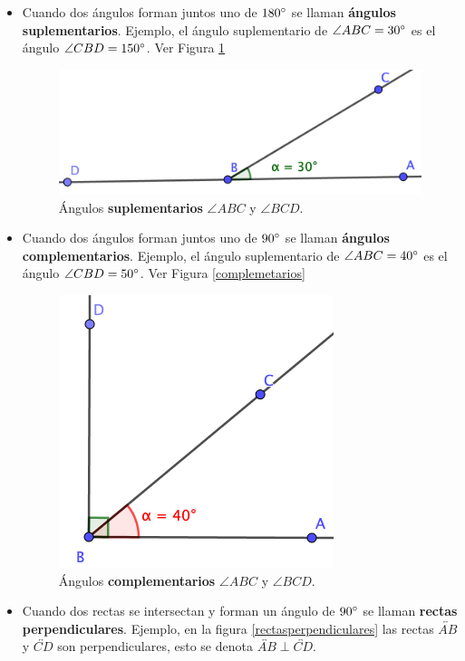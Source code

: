 \begin{itemize}
	\item Cuando dos ángulos forman juntos uno de $180\degree$ se llaman \textbf{ángulos suplementarios}. Ejemplo, el ángulo suplementario de $\angle ABC= 30\degree$ es el ángulo $\angle CBD = 150\degree $. Ver Figura \ref{suplementarios}
	
	\begin{figure}[H]
		\centering
		\includegraphics[width=0.7\linewidth]{Geometria/imgs/suplementarios}
		\caption{Ángulos \textbf{suplementarios} $\angle ABC$ y $\angle BCD$.}
		\label{suplementarios}
	\end{figure}
	
	\item Cuando dos ángulos forman juntos uno de $90\degree$ se llaman \textbf{ángulos complementarios}. Ejemplo, el ángulo suplementario de $\angle ABC= 40\degree$ es el ángulo $\angle CBD = 50\degree $. Ver Figura \ref{complemetarios}
	
	\begin{figure}[H]
		\centering
		\includegraphics[width=0.5\linewidth]{Geometria/imgs/complementarios}
		\caption{Ángulos \textbf{complementarios} $\angle ABC$ y $\angle BCD$.}
		\label{complementarios}
	\end{figure}
	
	\item Cuando dos rectas se intersectan y forman un ángulo de $90\degree$ se llaman \textbf{rectas perpendiculares}. Ejemplo, en la figura \ref{rectasperpendiculares} las rectas $\overleftrightarrow{AB}$ y $\overleftrightarrow{CD}$ son perpendiculares, esto se denota $\overleftrightarrow{AB}\perp \overleftrightarrow{CD}$.
	

\end{itemize}
